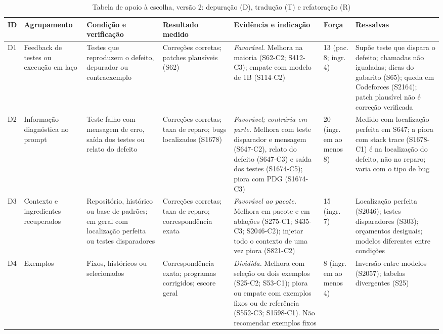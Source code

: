\begin{table}[!tp]
\caption{Tabela de apoio à escolha, versão 2: depuração (D), tradução (T) e refatoração (R)}\label{tab:apoiob}
\centering
\fontsize{6.6}{7.4}\selectfont
\renewcommand{\arraystretch}{0.95}
\setlength{\tabcolsep}{2.5pt}
\renewcommand*{\rr}{\raggedright\hspace{0pt}}
\begin{tabular}{p{0.55cm}p{2.0cm}p{2.4cm}p{1.9cm}p{5.6cm}p{1.6cm}p{3.1cm}}
\hline
\rr\textbf{ID} & \rr\textbf{Agrupamento} & \rr\textbf{Condição e verificação} & \rr\textbf{Resultado medido} & \rr\textbf{Evidência e indicação} & \rr\textbf{Força} & \rr\textbf{Ressalvas}\tabularnewline
\hline
\rr D1 & \rr Feedback de testes ou execução em laço & \rr Testes que reproduzem o defeito, depurador ou contraexemplo & \rr Correções corretas; patches plausíveis (S62) & \rr \textit{Favorável.} Melhora na maioria (S62-C2; S412-C3); empate com modelo de 1B (S114-C2) & \rr 13 (pac. 8; ingr. 4) & \rr Supõe teste que dispara o defeito; chamadas não igualadas; dicas do gabarito (S65); queda em Codeforces (S2164); patch plausível não é correção verificada\tabularnewline
\rr D2 & \rr Informação diagnóstica no prompt & \rr Teste falho com mensagem de erro, saída dos testes ou relato do defeito & \rr Correções corretas; taxa de reparo; bugs localizados (S1678) & \rr \textit{Favorável; contrária em parte.} Melhora com teste disparador e mensagem (S647-C2), relato do defeito (S647-C3) e saída dos testes (S1674-C5); piora com PDG (S1674-C3) & \rr 20 (ingr. em ao menos 8) & \rr Medido com localização perfeita em S647; a piora com stack trace (S1678-C1) é na localização do defeito, não no reparo; varia com o tipo de bug\tabularnewline
\rr D3 & \rr Contexto e ingredientes recuperados & \rr Repositório, histórico ou base de padrões; em geral com localização perfeita ou testes disparadores & \rr Correções corretas; taxa de reparo; correspondência exata & \rr \textit{Favorável ao pacote.} Melhora em pacote e em ablações (S275-C1; S435-C3; S2046-C2); injetar todo o contexto de uma vez piora (S821-C2) & \rr 15 (ingr. 7) & \rr Localização perfeita (S2046); testes disparadores (S303); orçamentos desiguais; modelos diferentes entre condições\tabularnewline
\rr D4 & \rr Exemplos & \rr Fixos, históricos ou selecionados & \rr Correspondência exata; programas corrigidos; escore geral & \rr \textit{Dividida.} Melhora com seleção ou dois exemplos (S25-C2; S53-C1); piora ou empate com exemplos fixos ou de referência (S552-C3; S1598-C1). Não recomendar exemplos fixos & \rr 8 (ingr. em ao menos 4) & \rr Inversão entre modelos (S2057); tabelas divergentes (S25)\tabularnewline

\end{tabular}
\end{table}

